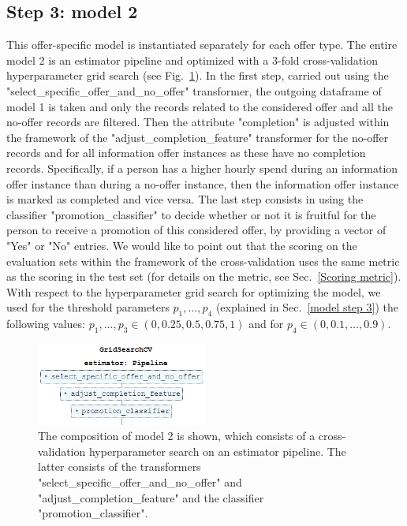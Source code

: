 \documentclass[11pt]{article} %
\begin{document}
\subsection{Step 3: model 2}
This offer-specific model is instantiated separately for each offer type.
The entire model 2 is an estimator pipeline and optimized with a 3-fold cross-validation hyperparameter grid search (see Fig.~\ref{implementation step3.1}).
In the first step, carried out using the "select\_specific\_offer\_and\_no\_offer" transformer, the outgoing dataframe of model 1 is taken and only the records related to the considered offer and all the no-offer records are filtered.
Then the attribute "completion" is adjusted within the framework of the "adjust\_completion\_feature" transformer for the no-offer records and for all information offer instances as these have no completion records.
Specifically, if a person has a higher hourly spend during an information offer instance than during a no-offer instance, then the information offer instance is marked as completed and vice versa.
The last step consists in using the classifier "promotion\_classifier" to decide whether or not it is fruitful for the person to receive a promotion of this considered offer, by providing a vector of "Yes" or "No" entries.
We would like to point out that the scoring on the evaluation sets within the framework of the cross-validation uses the same metric as the scoring in the test set (for details on the metric, see Sec.~\ref{Scoring metric}).
With respect to the hyperparameter grid search for optimizing the model, we used for the threshold parameters $p_1,\dots, p_4$ (explained in Sec.~\ref{model step 3}) the following values: $p_1,\dots, p_3 \in (0, 0.25, 0.5, 0.75, 1)$ and for $p_4 \in (0,0.1,\dots,0.9)$.
\begin{figure}[H]
\centering \includegraphics[width=0.5\textwidth]{pics/model2.png}
\caption{\label{implementation step3.1}The composition of model 2 is shown, which consists of a cross-validation hyperparameter search on an estimator pipeline.
The latter consists of the transformers "select\_specific\_offer\_and\_no\_offer" and "adjust\_completion\_feature" and the classifier "promotion\_classifier".
 }
\end{figure}
\end{document}
